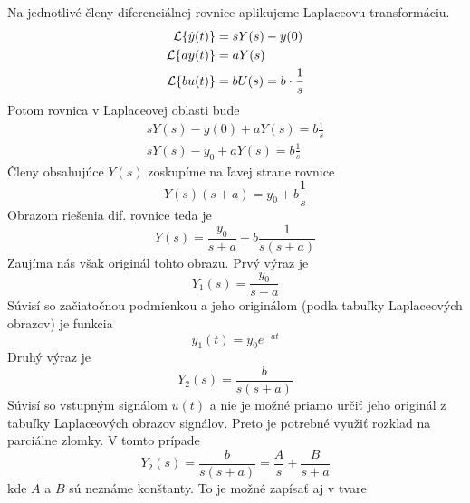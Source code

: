\documentclass[a4paper, 10pt, ]{article}
\begin{document}
\begin{itemize}[leftmargin=0pt, labelsep=3mm, itemsep=0pt]
    Na jednotlivé členy diferenciálnej rovnice aplikujeme Laplaceovu transformáciu.
    \begin{subequations}
        \begin{align}
            \mathcal{L}{\left\{\dot y(t)\right\}} &= s Y(s) - y(0) \\
            \mathcal{L}{\left\{a y(t)\right\}} &= a Y(s) \\
            \mathcal{L}{\left\{b u(t)\right\}} &= b U(s) = b \cdot \frac{1}{s}
        \end{align}
    \end{subequations}
    Potom rovnica v Laplaceovej oblasti bude
    \begin{subequations}
        \begin{align}
            s Y(s) - y(0) + a Y(s) = b \frac{1}{s} \\
            s Y(s) - y_0 + a Y(s) = b \frac{1}{s}
        \end{align}
    \end{subequations}
    Členy obsahujúce $Y(s)$ zoskupíme na ľavej strane rovnice
    \begin{equation}
        Y(s) (s + a) =  y_0 + b \frac{1}{s}
    \end{equation}
    Obrazom riešenia dif. rovnice teda je
    \begin{equation}
        Y(s) = \frac{y_0}{s + a} + b \frac{1}{s(s + a)}
    \end{equation}
    Zaujíma nás však originál tohto obrazu. Prvý výraz je 
    \begin{equation}
        Y_1(s) = \frac{y_0}{s + a}
    \end{equation}
    Súvisí so začiatočnou podmienkou a jeho originálom (podľa tabuľky Laplaceových obrazov) je funkcia
    \begin{equation}
        y_1(t) = y_0 e^{-at}
    \end{equation}
    Druhý výraz je
    \begin{equation}
        Y_2(s) =  \frac{b}{s(s + a)}
    \end{equation}
    Súvisí so vstupným signálom $u(t)$ a nie je možné priamo určiť jeho originál z tabuľky Laplaceových obrazov signálov. Preto je potrebné využiť rozklad na parciálne zlomky. V tomto prípade
    \begin{equation}
        Y_2(s) = \frac{b}{s(s + a)} = \frac{A}{s} + \frac{B}{s + a}
    \end{equation}
    kde $A$ a $B$ sú neznáme konštanty. To je možné zapísať aj v tvare 
    \begin{equation}

\end{equation}
\end{itemize}
\end{document}
